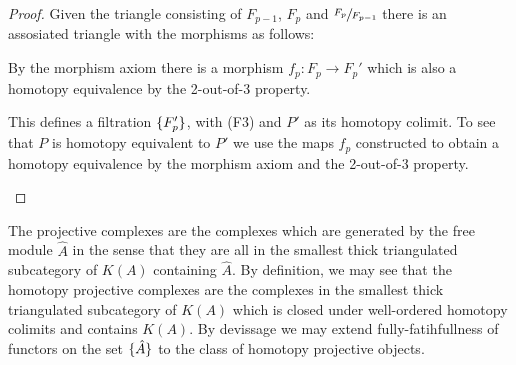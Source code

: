 \documentclass[../thesis.tex]{subfiles}
\begin{document}
\begin{proof}
                Given the triangle consisting of $F_{p-1}$, $F_p$ and $\sfrac{F_p}{F_{p-1}}$ there is an assosiated triangle with the morphisms as follows:
                \begin{center}
                \end{center}

                By the morphism axiom there is a morphism $f_p : F_p \rightarrow F_{p}'$ which is also a homotopy equivalence by the 2-out-of-3 property.

                This defines a filtration $\{F_p'\}$, with (F3) and $P'$ as its homotopy colimit. To see that $P$ is homotopy equivalent to $P'$ we use the maps $f_p$ constructed to obtain a homotopy equivalence by the morphism axiom and the 2-out-of-3 property.

                \begin{center}
                \end{center}
            \end{proof}

            The projective complexes are the complexes which are generated by the free module $\hat{A}$ in the sense that they are all in the smallest thick triangulated subcategory of $K(A)$ containing $\hat{A}$. By definition, we may see that the homotopy projective complexes are the complexes in the smallest thick triangulated subcategory of $K(A)$ which is closed under well-ordered homotopy colimits and contains $K(A)$. By devissage we may extend fully-fatihfullness of functors on the set $\{\hat{A}\}$ to the class of homotopy projective objects.
\end{document}
